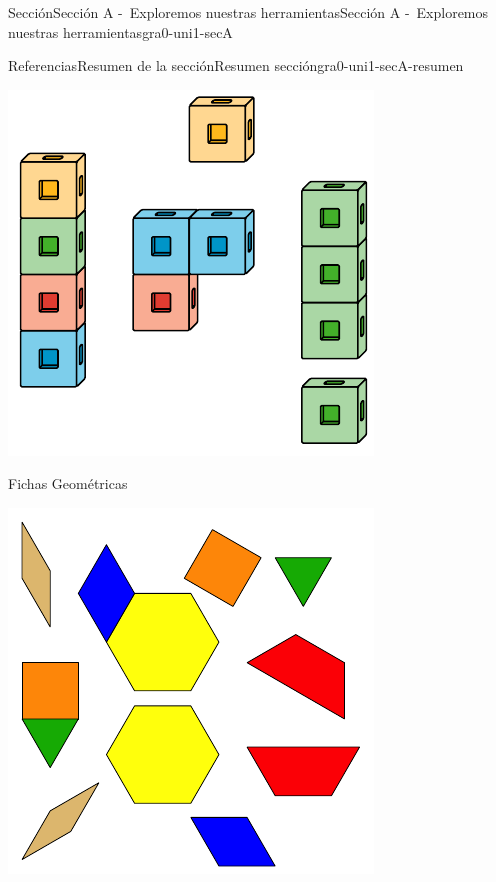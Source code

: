 \documentclass[twoside,10pt,]{article}
\begin{document}
\begin{sectionptx}{Sección}{Sección A -~Exploremos nuestras herramientas}{}{Sección A -~Exploremos nuestras herramientas}{}{}{gra0-uni1-secA}
\begin{references-subsection}{Referencias}{Resumen de la sección}{}{Resumen sección}{}{}{gra0-uni1-secA-resumen}
\begin{sidebyside}{2}{0.05}{0.05}{0.1}
\begin{sbspanel}{0.4}
\includegraphics[width=\linewidth]{external/svg-source/tikz-file-128850.pdf}
\end{sbspanel}%
\begin{sbspanel}{0.4}%
Fichas Geométricas%
\par
\includegraphics[width=\linewidth]{external/svg-source/tikz-file-147344.pdf}

\end{sbspanel}
\end{sidebyside}
\end{references-subsection}
\end{sectionptx}
\end{document}

